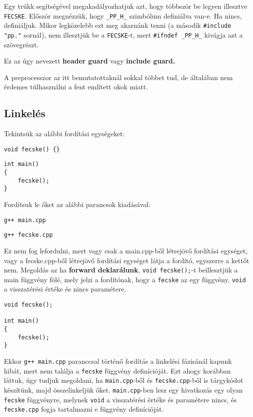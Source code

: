 \documentclass[a4paper,11.5pt,table]{article}
\begin{document}
	Egy trükk segítségével megakadályozhatjuk azt, hogy többször be legyen illesztve \texttt{FECSKE}. Először megnézzük, hogy \texttt{\_PP\_H\_} szimbólum definiálva van-e. Ha nincs, definiáljuk. Mikor legközelebb ezt meg akarnánk tenni (a második \texttt{\#include "pp."} sornál), nem illesztjük be a \texttt{FECSKE}-t, mert \texttt{\#ifndef \_PP\_H\_} kivágja azt a szövegrészt.
	
	Ez az úgy nevezett \textbf{header guard} vagy \textbf{include guard.}
	
	\medskip
	A preprocesszor az itt bemutatottaknál sokkal többet tud, de általában nem érdemes túlhasználni a fent említett okok miatt.
	
	\subsection{Linkelés}
	Tekintsük az alábbi fordítási egységeket:
	
	\smallskip
	\begin{lstlisting}
void fecske() {}
	\end{lstlisting}
	
	\smallskip
	\begin{lstlisting}
int main()
{
	fecske();
}
	\end{lstlisting}
	Fordítsuk le őket az alábbi parancsok kiadásával:
	
	{\centering\texttt{g++ main.cpp}\par}
	
	{\centering\texttt{g++ fecske.cpp}\par}
	
	Ez nem fog lefordulni, mert vagy csak a main.cpp-ből létrejövő fordítási egységet, vagy a fecske.cpp-ből létrejövő fordítási egységet látja a fordító, egyszerre a kettőt nem. Megoldás az ha \textbf{forward deklarálunk}, \texttt{void fecske();}-t beillesztjük a main függvény fölé, mely jelzi a fordítónak, hogy a \texttt{fecske} az egy függvény, \texttt{void} a visszatérési értéke és nincs paramétere. 
	
	\smallskip
	\begin{lstlisting}
void fecske();

int main()
{
	fecske();
}
	\end{lstlisting}
	Ekkor \texttt{g++ main.cpp} paranccsal történő fordítás a linkelési fázisánál kapunk hibát, mert nem találja a \texttt{fecske} függvény definícióját. Ezt ahogy korábban láttuk, úgy tudjuk megoldani, ha \texttt{main.cpp}-ből és \texttt{fecske.cpp}-ből is tárgykódot készítünk, majd összelinkeljük őket. \texttt{main.cpp}-ben lesz egy hivatkozás egy olyan \texttt{fecske} függvényre, melynek \texttt{void} a visszatérési értéke és paramétere nincs, és \texttt{fecske.cpp} fogja tartalmazni e függvény definícióját. 
		
\end{document}
